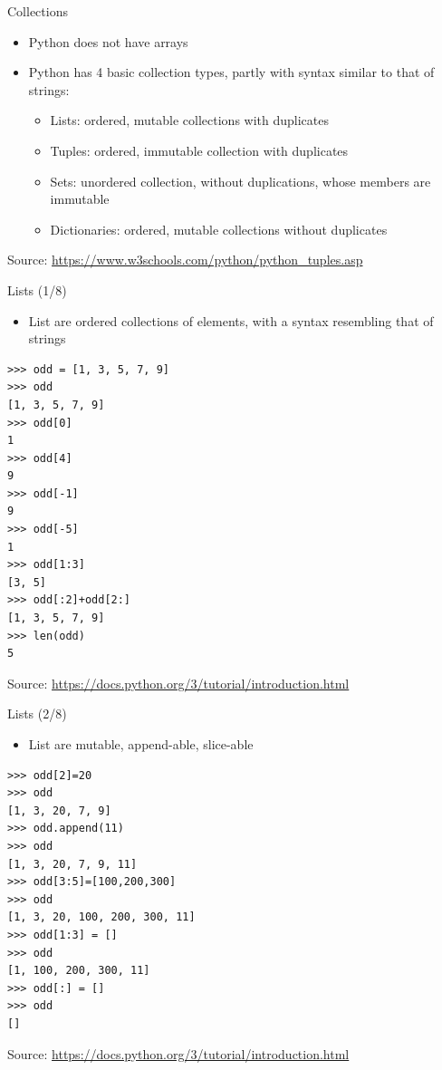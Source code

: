 \documentclass{beamer}
\begin{document}
\begin{frame}[fragile]
{\centerline{Collections}}
\begin{itemize}
    \item Python does not have arrays
    \item Python has 4 basic collection types, partly with syntax similar to that of strings:
  	 \begin{itemize}
   		 \item Lists: ordered, mutable collections with duplicates
		 \item Tuples: ordered, immutable collection with duplicates
		 \item Sets: unordered collection, without duplications, whose members are immutable
		 \item Dictionaries: ordered, mutable collections without duplicates
	\end{itemize} 
\end{itemize} 

\begin{center}
\tiny Source: \url{https://www.w3schools.com/python/python_tuples.asp}
\end{center}

\end{frame}


\begin{frame}[fragile]
{\centerline{Lists (1/8)}}
\begin{itemize}
    \item List are ordered collections of elements, with a syntax resembling that of strings
\end{itemize} 
\begin{lstlisting}[style=myPythonStyle]
>>> odd = [1, 3, 5, 7, 9]
>>> odd
[1, 3, 5, 7, 9]
>>> odd[0]
1
>>> odd[4]
9
>>> odd[-1]
9
>>> odd[-5]
1
>>> odd[1:3]
[3, 5]
>>> odd[:2]+odd[2:]
[1, 3, 5, 7, 9]
>>> len(odd)
5
\end{lstlisting}


\begin{center}
\tiny Source: \url{https://docs.python.org/3/tutorial/introduction.html}
\end{center}

\end{frame}


\begin{frame}[fragile]
{\centerline{Lists (2/8)}}
\begin{itemize}
    \item List are mutable, append-able, slice-able
\end{itemize} 
\begin{lstlisting}[style=myPythonStyle]
>>> odd[2]=20
>>> odd
[1, 3, 20, 7, 9]
>>> odd.append(11)
>>> odd
[1, 3, 20, 7, 9, 11]
>>> odd[3:5]=[100,200,300]
>>> odd
[1, 3, 20, 100, 200, 300, 11]
>>> odd[1:3] = []
>>> odd
[1, 100, 200, 300, 11]
>>> odd[:] = []
>>> odd
[]
\end{lstlisting}


\begin{center}
\tiny Source: \url{https://docs.python.org/3/tutorial/introduction.html}
\end{center}

\end{frame}
\end{document}
